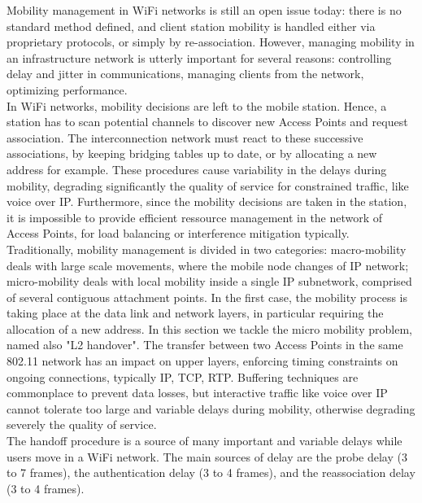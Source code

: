 \documentclass[journal,transmag]{IEEEtran}
\begin{document}
Mobility management in WiFi networks is still an open issue today: there is no standard method defined, and client station mobility is handled either via proprietary protocols, or simply by re-association. However, managing mobility in an infrastructure network is utterly important for several reasons: controlling delay and jitter in communications, managing clients from the network, optimizing performance. \cite{10Virtual_AP}  \\
In WiFi networks, mobility decisions are left to the mobile station. Hence, a station has to scan potential channels to discover new Access Points and request association. The interconnection network must react to these successive associations, by keeping bridging tables up to date,
or by allocating a new address for example. These procedures cause variability in the delays during mobility, degrading significantly the quality of service for constrained traffic, like voice over IP. Furthermore, since the mobility decisions are taken in the station, it is impossible to provide efficient ressource management in the network of Access Points, for load balancing or interference mitigation typically.  \cite{10Virtual_AP} \\

Traditionally, mobility management is divided in two categories: macro-mobility deals with large scale movements, where the mobile node changes of IP network; micro-mobility deals with local mobility inside a single IP subnetwork, comprised of several contiguous attachment points. In the first case, the mobility process is taking place at the data link and network layers, in particular requiring the allocation of a new address. In this section we tackle the micro mobility problem, named also "L2 handover". The transfer between two Access Points in the same 802.11 network has an impact on upper layers, enforcing timing constraints on ongoing connections, typically IP, TCP, RTP. Buffering techniques are commonplace to prevent data losses, but interactive traffic like voice over IP cannot tolerate too large and variable delays during mobility, otherwise degrading severely the quality of service. \cite{10Virtual_AP} \\
The handoff procedure is a source of many important and variable delays while users move in a WiFi network. The main sources of delay are the probe delay (3 to 7 frames), the authentication delay (3 to 4 frames), and the reassociation delay (3 to 4 frames). \cite{10Virtual_AP}\\
\end{document}

